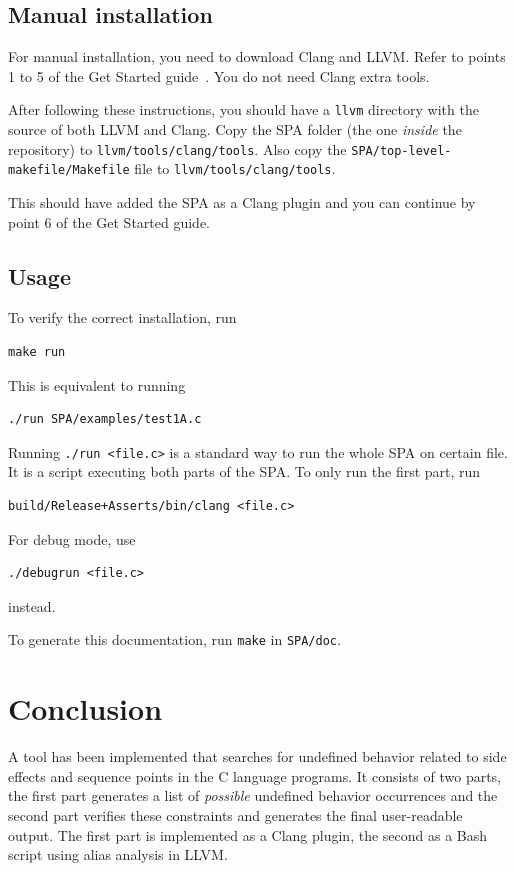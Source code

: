 \section{Manual installation}
For manual installation, you need to download Clang and LLVM. Refer to points 1 to 5 of the Get Started guide~\cite{clang-get_started}. You do not need Clang extra tools.

After following these instructions, you should have a \verb|llvm| directory with the source of both LLVM and Clang. Copy the SPA folder (the one \emph{inside} the repository) to \verb|llvm/tools/clang/tools|. Also copy the \verb|SPA/top-level-makefile/Makefile| file to \verb|llvm/tools/clang/tools|.

This should have added the SPA as a Clang plugin and you can continue by point 6 of the Get Started guide.
\section{Usage}
To verify the correct installation, run \begin{verbatim}make run\end{verbatim} This is equivalent to running \begin{verbatim}./run SPA/examples/test1A.c\end{verbatim}

Running \verb|./run <file.c>| is a standard way to run the whole SPA on certain file. It is a script executing both parts of the SPA. To only run the first part, run \begin{verbatim}build/Release+Asserts/bin/clang <file.c>\end{verbatim}
For debug mode, use \begin{verbatim}./debugrun <file.c>\end{verbatim} instead.

To generate this documentation, run \verb|make| in \verb|SPA/doc|.
\chapter{Conclusion}
A tool has been implemented that searches for undefined behavior related to side effects and sequence points in the C language programs. It consists of two parts, the first part generates a list of \emph{possible} undefined behavior occurrences and the second part verifies these constraints and generates the final user-readable output. The first part is implemented as a Clang plugin, the second as a Bash script using alias analysis in LLVM.

